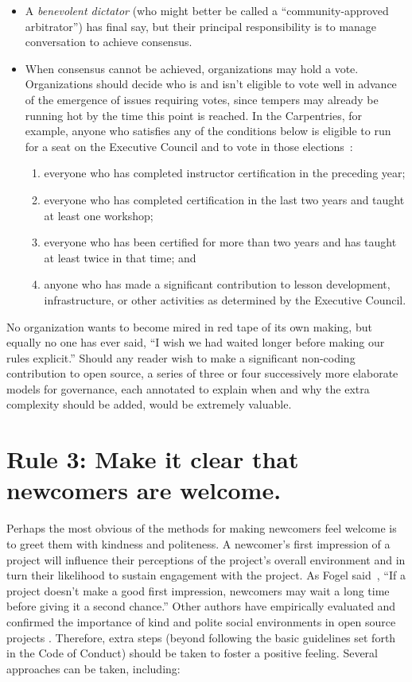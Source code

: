 \documentclass[10pt,letterpaper]{article}
\newcommand{\rulemajor}[1]{\section*{#1}}
\begin{document}
\begin{itemize}
	
\item
  A \emph{benevolent dictator} (who might better be called a ``community-approved arbitrator'') has final say,
  but their principal responsibility is to manage conversation to achieve consensus.
	
\item
  When consensus cannot be achieved,
  organizations may hold a vote.
  Organizations should decide who is and isn't eligible to vote well in advance of the emergence of issues requiring votes,
  since tempers may already be running hot by the time this point is reached.
  In the Carpentries,
  for example,
  anyone who satisfies any of the conditions below is eligible to run for a seat on the Executive Council
  and to vote in those elections~\cite{carpentries-bylaws}:
  \begin{enumerate}
  \item
    everyone who has completed instructor certification in the preceding year;
  \item
    everyone who has completed certification in the last two years and taught at least one workshop;
  \item
    everyone who has been certified for more than two years and has taught at least twice in that time; and
  \item
    anyone who has made a significant contribution to lesson development, infrastructure, or other activities
    as determined by the Executive Council.
  \end{enumerate}

\end{itemize}

No organization wants to become mired in red tape of its own making,
but equally no one has ever said,
``I wish we had waited longer before making our rules explicit.''
Should any reader wish to make a significant non-coding contribution to open source,
a series of three or four successively more elaborate models for governance,
each annotated to explain when and why the extra complexity should be added, would be extremely valuable.

\rulemajor{Rule 3: Make it clear that newcomers are welcome.}

Perhaps the most obvious of the methods for making newcomers feel welcome is to greet them with kindness and politeness.
A newcomer's first impression of a project will influence their perceptions of the project's overall environment
and in turn their likelihood to sustain engagement with the project.
As Fogel said~\cite{fogel2005},
``If a project doesn't make a good first impression, newcomers may wait a long time before giving it a second chance.''
Other authors have empirically evaluated and confirmed the importance of kind and polite social environments
in open source projects \cite{singh2012,steinmacher2013,steinmacher2018}.
Therefore,
extra steps
(beyond following the basic guidelines set forth in the Code of Conduct)
should be taken to foster a positive feeling.
Several approaches can be taken, including:
\end{document}
